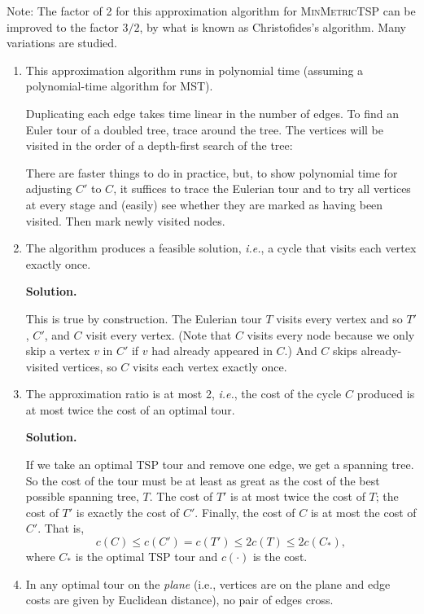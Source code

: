 \documentclass[2pt,legalpaper]{scrartcl}
\newcommand\solution{\textbf{Solution.}}
\begin{document}
\begin{multicols}{6}
{Note: The factor of 2 for this approximation algorithm for
\textsc{MinMetricTSP} can be improved to the factor $3/2$, by what is
known as Christofides's algorithm.  Many variations are studied.}

            \begin{enumerate}
\item This approximation algorithm runs in polynomial time (assuming a
  polynomial-time algorithm for \textsc{MST}).

Duplicating each edge takes time linear in the number of edges.  To
find an Euler tour of a doubled tree, trace around the tree.  The
vertices will be visited in the order of a depth-first search of the
tree:

\vspace*{2in}

There are faster things to do in practice, but, to show polynomial
time for adjusting $C'$ to $C$, it suffices to trace the Eulerian tour
and to try all vertices at every stage and (easily) see whether they
are marked as having been visited.  Then mark newly visited nodes.

\item The algorithm produces a feasible solution, {\em i.e.}, a cycle
  that visits each vertex exactly once.

\solution

This is true by construction.  The Eulerian tour $T$ visits every
vertex and so $T'$, $C'$, and $C$ visit every vertex.  (Note that $C$
visits every node because we only skip a vertex $v$ in $C'$ if $v$ had
already appeared in $C$.)  And $C$ skips already-visited vertices, so
$C$ visits each vertex exactly once.

\item The approximation ratio is at most 2, {\em i.e.}, the cost of
  the cycle $C$ produced is at most twice the cost of an optimal tour.

\solution

If we take an optimal TSP tour and remove one edge, we get a spanning
tree.  So the cost of the tour must be at least as great as the cost
of the best possible spanning tree, $T$.  The cost of $T'$ is at most
twice the cost of $T$; the cost of $T'$ is exactly the cost of $C'$.
Finally, the cost of $C$ is at most the cost of $C'$.  That is,
\[c(C)\le c(C')=c(T')\le 2c(T)\le 2c(C_*),\]
where $C_*$ is the optimal TSP tour and $c(\cdot)$ is the cost.

\item In any optimal tour on the {\em plane} (i.e., vertices are on
  the plane and edge costs are given by Euclidean distance), no pair
  of edges cross.


\end{enumerate}
\end{multicols}
\end{document}
